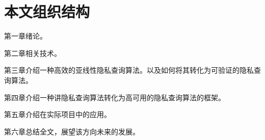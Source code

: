 \section{本文组织结构}

第一章绪论。

第二章相关技术。

第三章介绍一种高效的亚线性隐私查询算法。以及如何将其转化为可验证的隐私查询算法。

第四章介绍一种讲隐私查询算法转化为高可用的隐私查询算法的框架。

第五章介绍在实际项目中的应用。

第六章总结全文，展望该方向未来的发展。